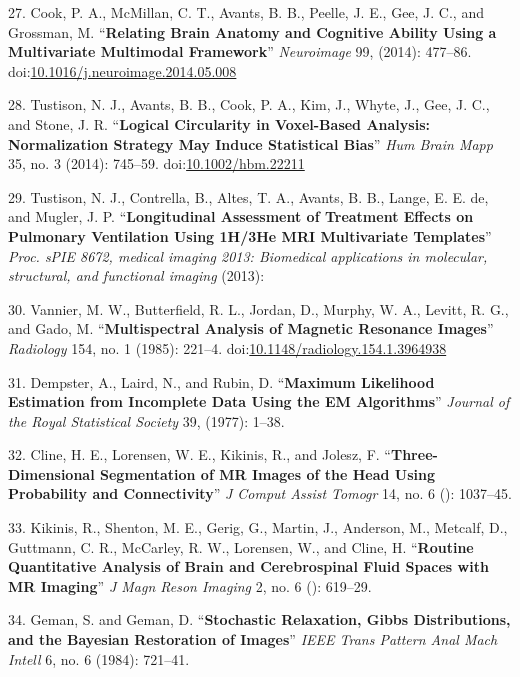 \documentclass[11pt,]{article}
\begin{document}
\hypertarget{ref-Cook:2014aa}{}
27. Cook, P. A., McMillan, C. T., Avants, B. B., Peelle, J. E., Gee, J.
C., and Grossman, M. ``\textbf{Relating Brain Anatomy and Cognitive
Ability Using a Multivariate Multimodal Framework}'' \emph{Neuroimage}
99, (2014): 477--86.
doi:\href{https://doi.org/10.1016/j.neuroimage.2014.05.008}{10.1016/j.neuroimage.2014.05.008}

\hypertarget{ref-Tustison:2014ad}{}
28. Tustison, N. J., Avants, B. B., Cook, P. A., Kim, J., Whyte, J.,
Gee, J. C., and Stone, J. R. ``\textbf{Logical Circularity in
Voxel-Based Analysis: Normalization Strategy May Induce Statistical
Bias}'' \emph{Hum Brain Mapp} 35, no. 3 (2014): 745--59.
doi:\href{https://doi.org/10.1002/hbm.22211}{10.1002/hbm.22211}

\hypertarget{ref-Tustison:2013ad}{}
29. Tustison, N. J., Contrella, B., Altes, T. A., Avants, B. B., Lange,
E. E. de, and Mugler, J. P. ``\textbf{Longitudinal Assessment of
Treatment Effects on Pulmonary Ventilation Using 1H/3He MRI Multivariate
Templates}'' \emph{Proc. sPIE 8672, medical imaging 2013: Biomedical
applications in molecular, structural, and functional imaging} (2013):

\hypertarget{ref-Vannier:1985aa}{}
30. Vannier, M. W., Butterfield, R. L., Jordan, D., Murphy, W. A.,
Levitt, R. G., and Gado, M. ``\textbf{Multispectral Analysis of Magnetic
Resonance Images}'' \emph{Radiology} 154, no. 1 (1985): 221--4.
doi:\href{https://doi.org/10.1148/radiology.154.1.3964938}{10.1148/radiology.154.1.3964938}

\hypertarget{ref-Dempster:1977aa}{}
31. Dempster, A., Laird, N., and Rubin, D. ``\textbf{Maximum Likelihood
Estimation from Incomplete Data Using the EM Algorithms}'' \emph{Journal
of the Royal Statistical Society} 39, (1977): 1--38.

\hypertarget{ref-Cline:1990aa}{}
32. Cline, H. E., Lorensen, W. E., Kikinis, R., and Jolesz, F.
``\textbf{Three-Dimensional Segmentation of MR Images of the Head Using
Probability and Connectivity}'' \emph{J Comput Assist Tomogr} 14, no. 6
(): 1037--45.

\hypertarget{ref-Kikinis:1992aa}{}
33. Kikinis, R., Shenton, M. E., Gerig, G., Martin, J., Anderson, M.,
Metcalf, D., Guttmann, C. R., McCarley, R. W., Lorensen, W., and Cline,
H. ``\textbf{Routine Quantitative Analysis of Brain and Cerebrospinal
Fluid Spaces with MR Imaging}'' \emph{J Magn Reson Imaging} 2, no. 6 ():
619--29.

\hypertarget{ref-Geman:1984aa}{}
34. Geman, S. and Geman, D. ``\textbf{Stochastic Relaxation, Gibbs
Distributions, and the Bayesian Restoration of Images}'' \emph{IEEE
Trans Pattern Anal Mach Intell} 6, no. 6 (1984): 721--41.
\end{document}
